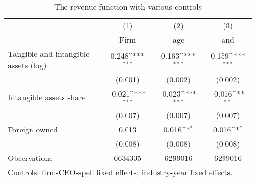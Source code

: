 \begin{table}[htbp]\centering
\def\sym#1{\ifmmode^{#1}\else\(^{#1}\)\fi}
\caption{The revenue function with various controls}
\begin{tabular}{l*{3}{c}}
\hline\hline
                    &\multicolumn{1}{c}{(1)}&\multicolumn{1}{c}{(2)}&\multicolumn{1}{c}{(3)}\\
                    &\multicolumn{1}{c}{Firm}&\multicolumn{1}{c}{age}&\multicolumn{1}{c}{and}\\
\hline
Tangible and intangible assets (log)&       0.248\sym{***}&       0.163\sym{***}&       0.159\sym{***}\\
                    &     (0.001)         &     (0.002)         &     (0.002)         \\
[1em]
Intangible assets share&      -0.021\sym{***}&      -0.023\sym{***}&      -0.016\sym{**} \\
                    &     (0.007)         &     (0.007)         &     (0.007)         \\
[1em]
Foreign owned       &       0.013         &       0.016\sym{*}  &       0.016\sym{*}  \\
                    &     (0.008)         &     (0.008)         &     (0.008)         \\
\hline
Observations        &     6634335         &     6299016         &     6299016         \\
\hline\hline
\multicolumn{4}{l}{\footnotesize Controls: firm-CEO-spell fixed effects; industry-year fixed effects.}\\
\end{tabular}
\end{table}
